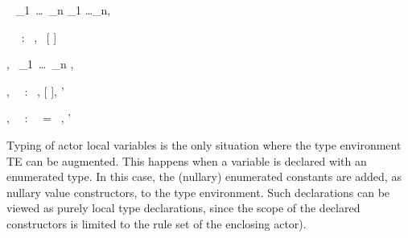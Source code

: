 \medskip{}

{\TE~ \vdash {}_1~\ldots~_n \gives \tau_1 \times \ldots \times \tau_n,~ }

\infrule[ActIO]
{\TE~\vdash \ty \gives \tau}
{\TE~\vdash {} ~:~ \ty \gives \tau,~ [ \mapsto \tau]}



{\VE,\TE~ \vdash {}_1~\ldots~_n \gives {}, }

{\VE,\TE~\vdash {} ~:~ \ty \gives \tau, [ \mapsto \tau], \TE'}

{\VE,\TE~\vdash {} ~:~ \ty ~=~  , \TE'}


\medskip
Typing of
actor local variables is the only situation where the type environment TE can be augmented. This
happens when a variable is declared with an enumerated type. In this case, the (nullary) enumerated
constants are added, as nullary value constructors, to the type environment. Such declarations can be viewed as
purely local type declarations, since the scope of the declared constructors is limited to the rule set of the enclosing actor).


